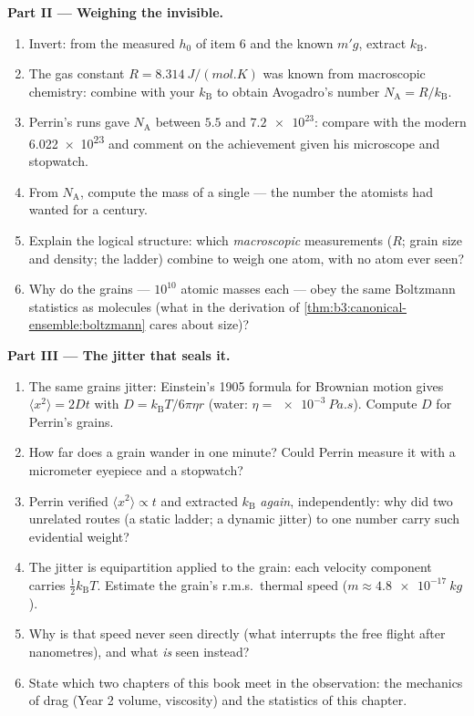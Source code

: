 \begin{problem}
\medskip\noindent\textbf{Part II --- Weighing the invisible.}
\begin{enumerate}[resume]
  \item Invert: from the measured $h_0$ of item 6 and the known
        $m'g$, extract $k_{\text{B}}$.
  \item The gas constant $R = \qty{8.314}{J/(mol.K)}$ was known
        from macroscopic chemistry: combine with your
        $k_{\text{B}}$ to obtain Avogadro's number $N_{\text{A}} =
        R/k_{\text{B}}$.
  \item Perrin's runs gave $N_{\text{A}}$ between $5.5$ and
        $\num{7.2e23}$: compare with the modern
        \num{6.022e23} and comment on the achievement given his
        microscope and stopwatch.
  \item From $N_{\text{A}}$, compute the mass of a single
         --- the number the atomists had wanted for a
        century.
  \item Explain the logical structure: which \emph{macroscopic}
        measurements ($R$; grain size and density; the ladder)
        combine to weigh one atom, with no atom ever seen?
  \item Why do the grains --- $10^{10}$ atomic masses each ---
        obey the same Boltzmann statistics as molecules (what in
        the derivation of
        \cref{thm:b3:canonical-ensemble:boltzmann} cares about
        size)?
\end{enumerate}

\medskip\noindent\textbf{Part III --- The jitter that seals it.}
\begin{enumerate}[resume]
  \item The same grains jitter: Einstein's 1905 formula for
        Brownian motion gives $\langle x^2\rangle = 2Dt$ with $D =
        k_{\text{B}}T/6\pi\eta r$ (water: $\eta =
        \qty{e-3}{Pa.s}$). Compute $D$ for Perrin's grains.
  \item How far does a grain wander in one minute? Could Perrin
        measure it with a micrometer eyepiece and a stopwatch?
  \item Perrin verified $\langle x^2\rangle \propto t$ and
        extracted $k_{\text{B}}$ \emph{again}, independently:
        why did two unrelated routes (a static ladder; a dynamic
        jitter) to one number carry such evidential weight?
  \item The jitter is equipartition applied to the grain: each
        velocity component carries $\tfrac12 k_{\text{B}}T$.
        Estimate the grain's r.m.s.\ thermal speed ($m \approx
        \qty{4.8e-17}{kg}$).
  \item Why is that speed never seen directly (what interrupts
        the free flight after nanometres), and what \emph{is}
        seen instead?
  \item State which two chapters of this book meet in the
        observation: the mechanics of drag (Year 2 volume,
        viscosity) and the statistics of this chapter.
\end{enumerate}


\end{problem}
